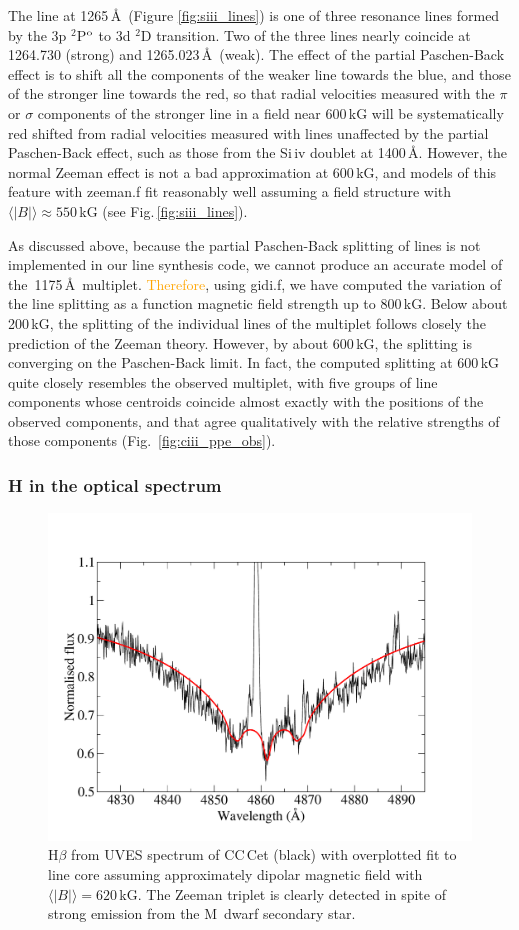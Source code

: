 \documentclass[fleqn,usenatbib]{mnras}
\newcommand{\bs}{\ensuremath{\langle \vert B \vert \rangle}}
\newcommand{\bgs}[1]{\textcolor{orange}{#1}}
\begin{document}
The   line at 1265\,\AA\ (Figure \ref{fig:siii_lines}) is one of three resonance lines formed by the 3p $^2$P$^{\rm o}$ to 3d $^2$D transition. Two of the three lines nearly coincide at 1264.730 (strong) and 1265.023\,\AA\ (weak). The effect of the partial Paschen-Back effect is to shift all the components of the weaker line towards the blue, and those of the stronger line towards the red, so that radial velocities measured with the $\pi$ or $\sigma$ components of the stronger line in a field near 600\,kG will be systematically red shifted from radial velocities measured with lines unaffected by the partial Paschen-Back effect, such as those from the Si\,{\sc iv} doublet at 1400\,\AA. However, the normal Zeeman effect is not a bad approximation at 600\,kG, and models of this feature with {\sc zeeman.f} fit reasonably well assuming a field structure with $\bs \approx 550$\,kG (see Fig.\,\ref{fig:siii_lines}).

As discussed above, because the partial Paschen-Back splitting of lines is not implemented in our line synthesis code, we cannot produce an accurate model of the  \,1175\,\AA\ multiplet. 
\bgs{Therefore}, using {\sc gidi.f}, we have computed the variation of the line splitting as a function magnetic field strength up to 800\,kG. Below about 200\,kG, the splitting of the individual lines of the multiplet follows closely the prediction of the Zeeman theory. However, by about 600\,kG, the splitting is converging on the Paschen-Back limit. In fact, the computed splitting at 600\,kG quite closely resembles the observed multiplet, with five groups of line components whose centroids coincide almost exactly with the positions of the observed components, and that agree qualitatively with the relative strengths of those components (Fig.~\ref{fig:ciii_ppe_obs}).

\subsubsection{H in the optical spectrum}
\label{sec:hlines}
\begin{figure}
    \centering
    \includegraphics[width=9 cm]{hbeta_obs_fit.pdf}
    \caption{H$\beta$ from UVES spectrum of CC\,Cet (black) with overplotted fit to line core assuming approximately dipolar magnetic field with $\bs = 620$\,kG. The Zeeman triplet is clearly detected in spite of strong emission from the M~dwarf secondary star.}
    \label{fig:hbeta_obs_fit}
\end{figure}
\end{document}
